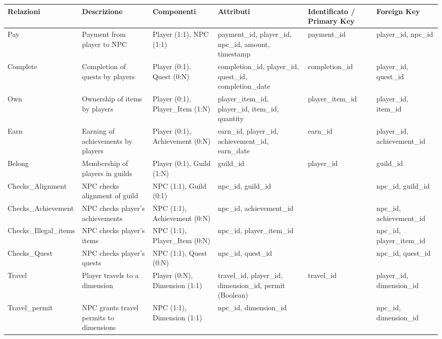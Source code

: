 \documentclass{article}
\begin{document}
\begin{center}
 \begin{small}
\begin{longtable}{ | l | p{6cm} | p{6cm} | p{6cm} | l | l | }
    \hline
    \textbf{Relazioni} & \textbf{Descrizione} & \textbf{Componenti} & \textbf{Attributi} & \textbf{Identificato / Primary Key} & \textbf{Foreign Key} \\
    \hline
    Pay & Payment from player to NPC & Player (1:1), NPC (1:1) & payment\_id, player\_id, npc\_id, amount, timestamp & payment\_id & player\_id, npc\_id \\
    \hline
    Complete & Completion of quests by players & Player (0:1), Quest (0:N) & completion\_id, player\_id, quest\_id, completion\_date & completion\_id & player\_id, quest\_id \\
    \hline
    Own & Ownership of items by players & Player (0:1), Player\_Item (1:N) & player\_item\_id, player\_id, item\_id, quantity & player\_item\_id & player\_id, item\_id \\
    \hline
    Earn & Earning of achievements by players & Player (0:1), Achievement (0:N) & earn\_id, player\_id, achievement\_id, earn\_date & earn\_id & player\_id, achievement\_id \\
    \hline
    Belong & Membership of players in guilds & Player (0:1), Guild (1:N) & guild\_id & player\_id & guild\_id \\
    \hline
    Checks\_Alignment & NPC checks alignment of guild & NPC (1:1), Guild (0:1) & npc\_id, guild\_id & & npc\_id, guild\_id \\
    \hline
    Checks\_Achievement & NPC checks player's achievements & NPC (1:1), Achievement (0:N) & npc\_id, achievement\_id & & npc\_id, achievement\_id \\
    \hline
    Checks\_Illegal\_items & NPC checks player's items & NPC (1:1), Player\_Item (0:N) & npc\_id, player\_item\_id & & npc\_id, player\_item\_id \\
    \hline
    Checks\_Quest & NPC checks player's quests & NPC (1:1), Quest (0:N) & npc\_id, quest\_id & & npc\_id, quest\_id \\
    \hline
    Travel & Player travels to a dimension & Player (0:N), Dimension (1:1) & travel\_id, player\_id, dimension\_id, permit (Boolean) & travel\_id & player\_id, dimension\_id \\
    \hline
    Travel\_permit & NPC grants travel permits to dimensions & NPC (1:1), Dimension (1:1) & npc\_id, dimension\_id & & npc\_id, dimension\_id \\
    \hline
\end{longtable}
\end{small}
\end{center}
\end{document}
